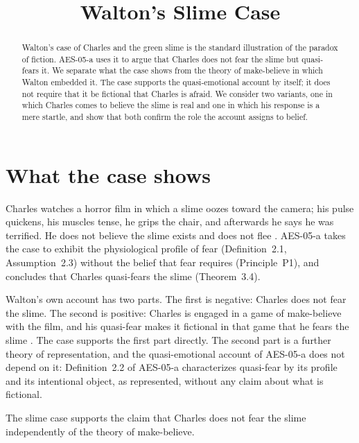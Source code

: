\documentclass{situationist-preprint}
\title{Walton's Slime Case}
\begin{document}
\maketitle

\begin{abstract}
Walton's case of Charles and the green slime is the standard illustration of the paradox of fiction. AES-05-a uses it to argue that Charles does not fear the slime but quasi-fears it. We separate what the case shows from the theory of make-believe in which Walton embedded it. The case supports the quasi-emotional account by itself; it does not require that it be fictional that Charles is afraid. We consider two variants, one in which Charles comes to believe the slime is real and one in which his response is a mere startle, and show that both confirm the role the account assigns to belief.
\end{abstract}

\section{What the case shows}

Charles watches a horror film in which a slime oozes toward the camera; his pulse quickens, his muscles tense, he grips the chair, and afterwards he says he was terrified. He does not believe the slime exists and does not flee \citep{Walton1978}. AES-05-a takes the case to exhibit the physiological profile of fear (Definition~2.1, Assumption~2.3) without the belief that fear requires (Principle~P1), and concludes that Charles quasi-fears the slime (Theorem~3.4).

Walton's own account has two parts. The first is negative: Charles does not fear the slime. The second is positive: Charles is engaged in a game of make-believe with the film, and his quasi-fear makes it fictional in that game that he fears the slime \citep{Walton1990}. The case supports the first part directly. The second part is a further theory of representation, and the quasi-emotional account of AES-05-a does not depend on it: Definition~2.2 of AES-05-a characterizes quasi-fear by its profile and its intentional object, as represented, without any claim about what is fictional.

\begin{proposition}\label{p:indep}
The slime case supports the claim that Charles does not fear the slime independently of the theory of make-believe.
\end{proposition}
\end{document}

